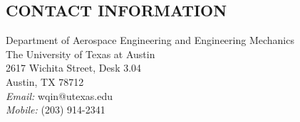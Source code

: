 \documentclass[]{res}
\makeatletter
\let\saved@bibitem\@bibitem
\makeatother
\begin{document}
\begingroup
\makeatletter
\let\@bibitem\saved@bibitem
{}
\endgroup

\ifut\else
{}
\fi

\begin{resume}

\ifut\else
\section{CONTACT INFORMATION}
\vspace{.05in}
Department of Aerospace Engineering and Engineering Mechanics \\
The University of Texas at Austin \\
2617 Wichita Street, Desk 3.04\\
Austin, TX 78712\\
{\it Email:} wqin@utexas.edu \\
{\it Mobile:} (203) 914-2341
\fi


\end{resume}
\end{document}
